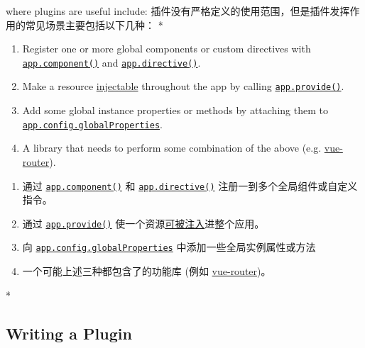 \begin{paracol}{2}
where plugins are useful include:
\switchcolumn
插件没有严格定义的使用范围，但是插件发挥作用的常见场景主要包括以下几种：
\switchcolumn[0]*%
\begin{enumerate}
\item
  Register one or more global components or custom directives with
  \href{https://vuejs.org/api/application.html\#app-component}{\texttt{app.component()}}
  and
  \href{https://vuejs.org/api/application.html\#app-directive}{\texttt{app.directive()}}.
\item
  Make a resource
  \href{https://vuejs.org/guide/components/provide-inject.html}{injectable}
  throughout the app by calling
  \href{https://vuejs.org/api/application.html\#app-provide}{\texttt{app.provide()}}.
\item
  Add some global instance properties or methods by attaching them to
  \href{https://vuejs.org/api/application.html\#app-config-globalproperties}{\texttt{app.config.globalProperties}}.
\item
  A library that needs to perform some combination of the above (e.g.
  \href{https://github.com/vuejs/vue-router-next}{vue-router}).
\end{enumerate}
\switchcolumn
\begin{enumerate}
\item
  通过
  \href{https://cn.vuejs.org/api/application.html\#app-component}{\texttt{app.component()}}
  和
  \href{https://cn.vuejs.org/api/application.html\#app-directive}{\texttt{app.directive()}}
  注册一到多个全局组件或自定义指令。
\item
  通过
  \href{https://cn.vuejs.org/api/application.html\#app-provide}{\texttt{app.provide()}}
  使一个资源\href{https://cn.vuejs.org/guide/components/provide-inject.html}{可被注入}进整个应用。
\item
  向
  \href{https://cn.vuejs.org/api/application.html\#app-config-globalproperties}{\texttt{app.config.globalProperties}}
  中添加一些全局实例属性或方法
\item
  一个可能上述三种都包含了的功能库 (例如
  \href{https://github.com/vuejs/vue-router-next}{vue-router})。
\end{enumerate}
\switchcolumn[0]*%
\subsection{Writing a Plugin}
\switchcolumn

\end{paracol}
